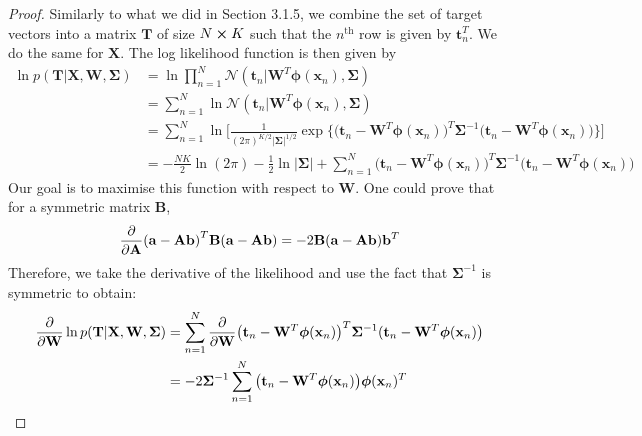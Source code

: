 \vspace{1em}

\begin{proof}
    Similarly to what we did in Section 3.1.5, we combine
    the set of target vectors into a matrix $\mathbf{T}$ of
    size $N \cross K$ such that the $n^{\text{th}}$ row
    is given by $\mathbf{t}_n^T$. We do the same for
    $\mathbf{X}$. The log likelihood 
    function is then given by
    \begin{align*}
        \ln p(\mathbf{T} | \mathbf{X}, \mathbf{W}, \mathbf{\Sigma})
        &= \ln \prod_{n = 1}^N 
            \mathcal{N}(\mathbf{t}_n | \mathbf{W}^T\bm{\phi}(\mathbf{x}_n), \mathbf{\Sigma}) \\
        &= \sum_{n=1}^{N} 
            \ln \mathcal{N}(\mathbf{t}_n | \mathbf{W}^T\bm{\phi}(\mathbf{x}_n), \mathbf{\Sigma}) \\
        &= \sum_{n=1}^{N} \ln \bigg[\frac{1}{(2\pi)^{K/2}|\mathbf{\Sigma}|^{1/2}}
            \exp\big\{\big(\mathbf{t}_n - \mathbf{W}^T \bm{\phi}(\mathbf{x}_n)\big)^T
            \mathbf{\Sigma}^{-1}(\mathbf{t}_n - \mathbf{W}^T \bm{\phi}(\mathbf{x}_n)\big)
        \big\}\bigg] \\
        &= -\frac{NK}{2} \ln(2\pi) - \frac{1}{2} \ln|\mathbf{\Sigma}| 
            + \sum_{n=1}^{N} \big(\mathbf{t}_n - \mathbf{W}^T \bm{\phi}(\mathbf{x}_n)\big)^T
            \mathbf{\Sigma}^{-1}(\mathbf{t}_n - \mathbf{W}^T \bm{\phi}(\mathbf{x}_n)\big)
    \end{align*}
    Our goal is to maximise this function with respect to $\mathbf{W}$.
    One could prove that for a symmetric matrix $\mathbf{B}$,
    \[
        \pdv{\mathbf{A}}(\mathbf{a} - \mathbf{A}\mathbf{b})^T
        \mathbf{B}(\mathbf{a} - \mathbf{A}\mathbf{b})
        = -2\mathbf{B}(\mathbf{a} - \mathbf{A}\mathbf{b})\mathbf{b}^T
    \] 
    Therefore, we take the derivative of the likelihood and use the fact that
    $\mathbf{\Sigma}^{-1}$ is symmetric to obtain:
    \begin{align*}
        \pdv{\mathbf{W}} \ln p(\mathbf{T} | \mathbf{X}, \mathbf{W}, \mathbf{\Sigma})
        &= \sum_{n=1}^{N} \pdv{\mathbf{W}} 
            \big(\mathbf{t}_n - \mathbf{W}^T \bm{\phi}(\mathbf{x}_n)\big)^T
            \mathbf{\Sigma}^{-1}(\mathbf{t}_n - \mathbf{W}^T \bm{\phi}(\mathbf{x}_n)\big) \\
        &= -2\mathbf{\Sigma}^{-1} \sum_{n=1}^{N} \big(\mathbf{t}_n - \mathbf{W}^T\bm{\phi}(\mathbf{x}_n)\big)
            \bm{\phi}(\mathbf{x}_n)^T
    \end{align*}

\end{proof}
